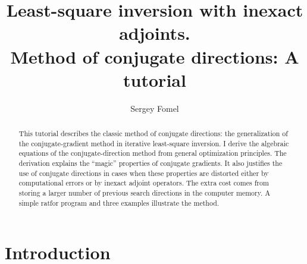 \def\cakedir{.}
\def\figdir{./Fig}

\title{Least-square inversion with inexact adjoints. \\
Method of conjugate directions: A tutorial}

\author{Sergey Fomel}

\maketitle

\begin{abstract}
  This tutorial describes the classic method of conjugate directions:
  the generalization of the conjugate-gradient method in iterative
  least-square inversion. I derive the algebraic equations of the
  conjugate-direction method from general optimization
  principles. The derivation explains the ``magic'' properties of
  conjugate gradients. It also justifies the use of conjugate
  directions in cases when these properties are distorted
  either by computational errors or by inexact adjoint operators. The
  extra cost comes from storing a larger number of previous search directions
  in the computer memory. A simple ratfor program and three examples
  illustrate the method.
\end{abstract}


\section{Introduction}

